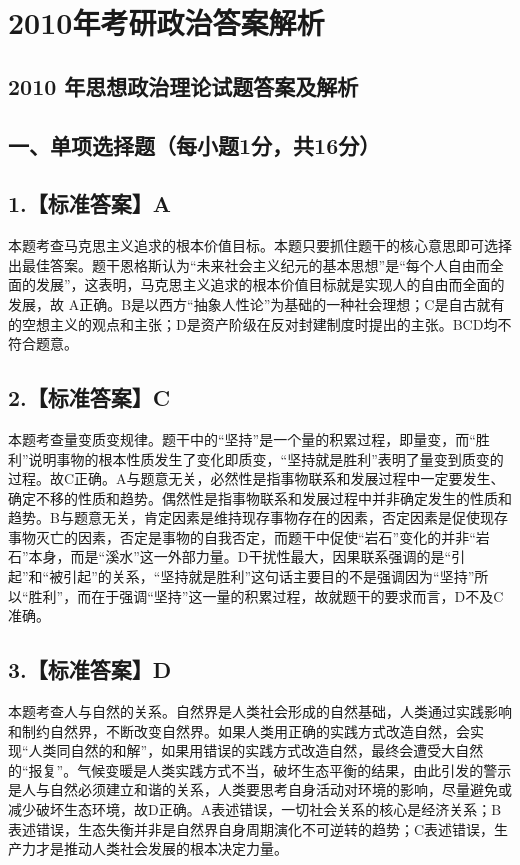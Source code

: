 \documentclass[UTF8,11pt]{ctexart}
\begin{document}
\section*{2010年考研政治答案解析}
\subsection*{2010 年思想政治理论试题答案及解析}

\subsection*{一、单项选择题（每小题1分，共16分）}

\subsection*{1.【标准答案】A}

本题考查马克思主义追求的根本价值目标。本题只要抓住题干的核心意思即可选择出最佳答案。题干恩格斯认为“未来社会主义纪元的基本思想”是“每个人自由而全面的发展”，这表明，马克思主义追求的根本价值目标就是实现人的自由而全面的发展，故 A正确。B是以西方“抽象人性论”为基础的一种社会理想；C是自古就有的空想主义的观点和主张；D是资产阶级在反对封建制度时提出的主张。BCD均不符合题意。


\subsection*{2.【标准答案】C}

本题考查量变质变规律。题干中的“坚持”是一个量的积累过程，即量变，而“胜利”说明事物的根本性质发生了变化即质变，“坚持就是胜利”表明了量变到质变的过程。故C正确。A与题意无关，必然性是指事物联系和发展过程中一定要发生、确定不移的性质和趋势。偶然性是指事物联系和发展过程中并非确定发生的性质和趋势。B与题意无关，肯定因素是维持现存事物存在的因素，否定因素是促使现存事物灭亡的因素，否定是事物的自我否定，而题干中促使“岩石”变化的并非“岩石”本身，而是“溪水”这一外部力量。D干扰性最大，因果联系强调的是“引起”和“被引起”的关系，“坚持就是胜利”这句话主要目的不是强调因为“坚持”所以“胜利”，而在于强调“坚持”这一量的积累过程，故就题干的要求而言，D不及C准确。


\subsection*{3.【标准答案】D}

本题考查人与自然的关系。自然界是人类社会形成的自然基础，人类通过实践影响和制约自然界，不断改变自然界。如果人类用正确的实践方式改造自然，会实现“人类同自然的和解”，如果用错误的实践方式改造自然，最终会遭受大自然的“报复”。气候变暖是人类实践方式不当，破坏生态平衡的结果，由此引发的警示是人与自然必须建立和谐的关系，人类要思考自身活动对环境的影响，尽量避免或减少破坏生态环境，故D正确。A表述错误，一切社会关系的核心是经济关系；B表述错误，生态失衡并非是自然界自身周期演化不可逆转的趋势；C表述错误，生产力才是推动人类社会发展的根本决定力量。
\end{document}
